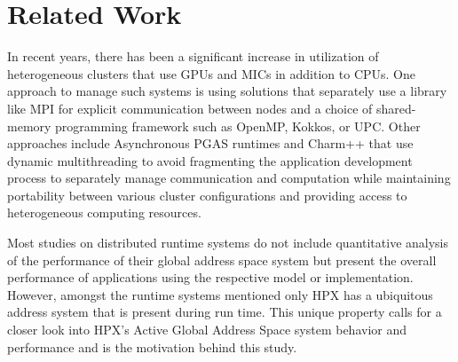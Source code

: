 \section{Related Work}
\label{related_work}

In recent years, there has been a significant increase in utilization of
heterogeneous clusters that use GPUs and MICs in addition to
CPUs\cite{Lena2014,Yang2011266,Potluri2014,Sidelnik2011}. One approach to
manage such systems is using
solutions\cite{Rabenseifner2009,Yang2011266,Chorley2010} that separately use a
library like MPI for explicit communication between nodes and a choice of
shared-memory programming framework such as OpenMP\cite{openmp_org}, Kokkos\cite{kokkos_paper,kokkos_repo}, or
UPC\cite{upc_org}. Other approaches include Asynchronous PGAS
runtimes\cite{Saraswat2010} and Charm++\cite{charm_edu} that use dynamic
multithreading to avoid fragmenting the application development process to
separately manage communication and computation while maintaining portability
between various cluster configurations and providing access to heterogeneous
computing resources\cite{P0234R0}.

Most studies on distributed runtime systems do not include quantitative
analysis of the performance of their global address space system but present
the overall performance of applications using the respective model or
implementation. However, amongst the runtime systems mentioned only HPX has a
ubiquitous address system that is present during run time. This unique property
calls for a closer look into HPX's Active Global Address Space system behavior
and performance and is the motivation behind this study.
